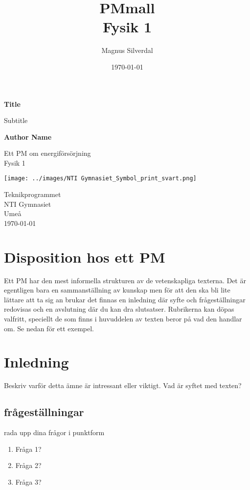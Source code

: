 \documentclass[11p]{article}
\title{PMmall \\ \small Fysik 1}
\author{Magnus Silverdal }
\date{\today}
\begin{document}
    \begin{titlepage}
        \begin{center}
            \vspace*{1cm}

            \Huge
            \textbf{Title}

            \vspace{0.5cm}
            \LARGE
            Subtitle

            \vspace{1.5cm}

            \textbf{Author Name}

            \vfill

            Ett PM om energiförsörjning \\
            Fysik 1

            \vspace{0.8cm}

            \texttt{[image: ../images/NTI Gymnasiet\_Symbol\_print\_svart.png]}

            \Large
            Teknikprogrammet\\
            NTI Gymnasiet\\
            Umeå\\
            \today

        \end{center}
    \end{titlepage}
    \tableofcontents
    \newpage
    \section{Disposition hos ett PM}
    Ett PM har den mest informella strukturen av de vetenskapliga texterna. Det är egentligen bara en sammanställning av kunskap men för att den ska bli lite lättare att ta sig an brukar det finnas en inledning där syfte och frågeställningar redovisas och en avslutning där du kan dra slutsatser. Rubrikerna kan döpas valfritt, speciellt de som finns i huvuddelen av texten beror på vad den handlar om. Se nedan för ett exempel.

    \section{Inledning}
    Beskriv varför detta ämne är intressant eller viktigt. Vad är syftet med texten?
    \subsection{frågeställningar}
    rada upp dina frågor i punktform
    \begin{enumerate}
        \item Fråga 1?
        \item Fråga 2?
        \item Fråga 3?
    \end{enumerate}
\end{document}
